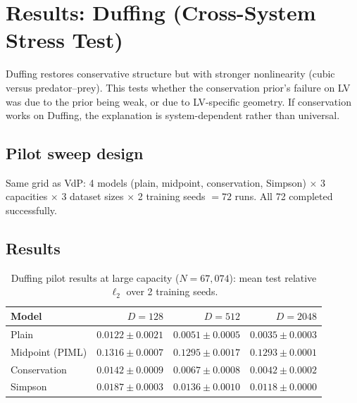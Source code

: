 \documentclass[11pt]{article}
\begin{document}
\section{Results: Duffing (Cross-System Stress Test)}
\label{sec:results-duffing}

Duffing restores conservative structure but with stronger nonlinearity (cubic versus predator--prey).
This tests whether the conservation prior's failure on LV was due to the prior being weak, or due to LV-specific geometry.
If conservation works on Duffing, the explanation is system-dependent rather than universal.

\subsection{Pilot sweep design}

Same grid as VdP: 4 models (plain, midpoint, conservation, Simpson) $\times$ 3 capacities $\times$ 3 dataset sizes $\times$ 2 training seeds $= 72$ runs.
All 72 completed successfully.

\subsection{Results}

\begin{table}[H]
    \centering
    \caption{Duffing pilot results at large capacity ($N = 67{,}074$): mean test relative $\ell_2$ over 2 training seeds.}
    \label{tab:duffing-results}
    \small
    \begin{tabular}{lrrr}
        \toprule
        Model & $D = 128$ & $D = 512$ & $D = 2048$ \\
        \midrule
        Plain            & $0.0122 \pm 0.0021$ & $0.0051 \pm 0.0005$ & $0.0035 \pm 0.0003$ \\
        Midpoint (PIML)  & $0.1316 \pm 0.0007$ & $0.1295 \pm 0.0017$ & $0.1293 \pm 0.0001$ \\
        Conservation     & $0.0142 \pm 0.0009$ & $0.0067 \pm 0.0008$ & $0.0042 \pm 0.0002$ \\
        Simpson          & $0.0187 \pm 0.0003$ & $0.0136 \pm 0.0010$ & $0.0118 \pm 0.0000$ \\
        \bottomrule
    \end{tabular}
\end{table}
\end{document}
